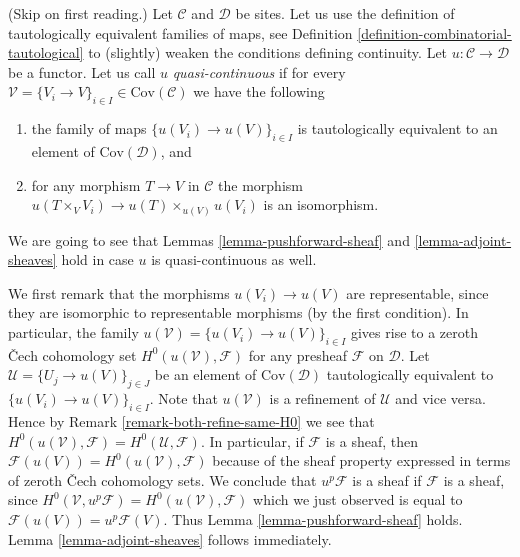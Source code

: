 \begin{remark}
\label{remark-quasi-continuous}
(Skip on first reading.)
Let $\mathcal{C}$ and $\mathcal{D}$ be sites. Let us
use the definition of tautologically equivalent families of maps,
see Definition \ref{definition-combinatorial-tautological}
to (slightly) weaken the conditions defining continuity.
Let $u : \mathcal{C} \to \mathcal{D}$ be a functor.
Let us call $u$ {\it quasi-continuous} if for every
$\mathcal{V} = \{V_i \to V\}_{i\in I} \in \text{Cov}(\mathcal{C})$
we have the following
\begin{enumerate}
\item[(1')] the family of maps
$\{u(V_i) \to u(V)\}_{i\in I}$ is tautologically equivalent
to an element of $\text{Cov}(\mathcal{D})$, and
\item[(2)] for any morphism $T \to V$ in $\mathcal{C}$ the morphism
$u(T \times_V V_i) \to u(T) \times_{u(V)} u(V_i)$ is an isomorphism.
\end{enumerate}
We are going to see that Lemmas \ref{lemma-pushforward-sheaf}
and \ref{lemma-adjoint-sheaves} hold in case
$u$ is quasi-continuous as well.

\medskip\noindent
We first remark that the morphisms $u(V_i) \to u(V)$ are representable, since
they are isomorphic to representable morphisms (by the first condition).
In particular, the family $u(\mathcal{V}) = \{u(V_i) \to u(V)\}_{i\in I}$
gives rise to a zeroth {\v C}ech cohomology set
$H^0(u(\mathcal{V}), \mathcal{F})$ for any presheaf $\mathcal{F}$ on
$\mathcal{D}$.
Let $\mathcal{U} = \{U_j \to u(V)\}_{j \in J}$ be an element
of $\text{Cov}(\mathcal{D})$ tautologically
equivalent to $\{u(V_i) \to u(V)\}_{i \in I}$. Note that $u(\mathcal{V})$
is a refinement of $\mathcal{U}$ and vice versa. Hence by Remark
\ref{remark-both-refine-same-H0} we see that
$H^0(u(\mathcal{V}), \mathcal{F}) = H^0(\mathcal{U}, \mathcal{F})$.
In particular, if $\mathcal{F}$ is a sheaf, then
$\mathcal{F}(u(V)) = H^0(u(\mathcal{V}), \mathcal{F})$ because
of the sheaf property expressed in terms of zeroth {\v C}ech cohomology
sets. We conclude that $u^p\mathcal{F}$ is a sheaf if $\mathcal{F}$
is a sheaf, since $H^0(\mathcal{V}, u^p\mathcal{F}) =
H^0(u(\mathcal{V}), \mathcal{F})$ which we just observed is
equal to $\mathcal{F}(u(V)) = u^p\mathcal{F}(V)$. Thus Lemma
\ref{lemma-pushforward-sheaf} holds. Lemma \ref{lemma-adjoint-sheaves}
follows immediately.
\end{remark}






